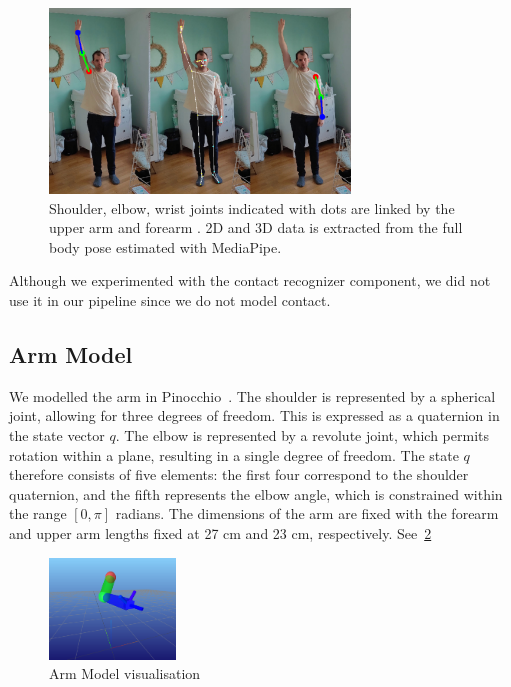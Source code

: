 \begin{figure}
    \centering
    \includegraphics[width=8cm]{figures/pose_detection_mediapipe_collage.png}
    \caption{
    \color{red}Shoulder, \color{darkgreen}elbow, \color{blue}wrist \color{black} joints indicated with dots
    are linked by the \color{darkgreen}upper arm \color{black} and \color{blue}forearm \color{black}. 2D and 3D data is extracted from
    the full body pose estimated with MediaPipe.
    }
    \label{fig:mediapipe}
\end{figure}

Although we experimented with the contact recognizer component, we did not use it in our pipeline since we do not model contact.

\subsection{Arm Model}
\label{subsec:arm_model}
We modelled the arm in Pinocchio~\cite{carpentier2019pinocchio}. The shoulder is represented by a spherical joint, allowing for three degrees 
of freedom. This is expressed as a quaternion in the state vector \(q\). The elbow is represented by a revolute joint, which permits rotation 
within a plane, resulting in a single degree of freedom. The state \(q\) therefore consists of five elements: the first four correspond to the 
shoulder quaternion, and the fifth represents the elbow angle, which is constrained within the range \([0, \pi]\) radians. The dimensions of 
the arm are fixed with the forearm and upper arm lengths fixed at 27 cm and 23 cm, respectively. See~\cref{fig:arm_model}

\begin{figure}
    \centering
    \includegraphics[width=0.3\textwidth]{figures/live_arm.png}
    \caption{Arm Model visualisation}
    \label{fig:arm_model}
\end{figure}

